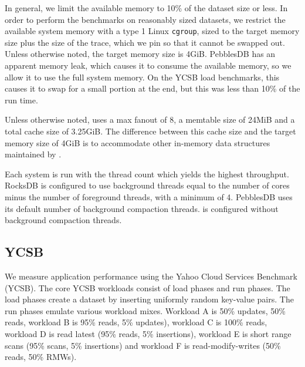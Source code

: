In general, we limit the available memory to 10\% of the dataset size or less.
In order to perform the benchmarks on reasonably sized datasets, we restrict
the available system memory with a type 1 Linux \texttt{cgroup}, sized to the
target memory size plus the size of the trace, which we pin so that it cannot
be swapped out. Unless otherwise noted, the target memory size is 4GiB.
PebblesDB has an apparent memory leak, which causes it to consume the available
memory, so we allow it to use the full system memory. On the YCSB load
benchmarks, this causes it to swap for a small portion at the end, but this was
less than 10\% of the  run time.

Unless otherwise noted, \sysname{} uses a max fanout of 8, a memtable size of
24MiB and a total cache size of 3.25GiB. The difference between this cache size
and the target memory size of 4GiB is to accommodate other in-memory data
structures maintained by \sysname.

Each system is run with the thread count which yields the highest throughput.
RocksDB is configured to use background threads equal to the number of cores
minus the number of foreground threads, with a minimum of 4. PebblesDB uses its
default number of background compaction threads. \sysname is configured without
background compaction threads.

\subsection{YCSB}\label{sec:ycsb}

We measure application performance using the Yahoo Cloud Services Benchmark
(YCSB). The core YCSB workloads consist of load phases and run phases.
The load phases create a dataset by inserting uniformly random
key-value pairs. 
The run phases emulate various workload mixes. Workload A is 
50\% updates, 50\% reads, workload B is 95\% reads, 5\%
updates), workload C is 100\% reads, workload D is read latest (95\%
reads, 5\% insertions), workload E is short range scans (95\% scans, 5\% insertions)
and workload F is read-modify-writes (50\% reads, 50\% RMWs).

